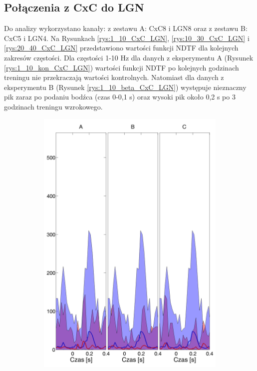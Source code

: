 \documentclass{pracamgr}
\begin{document}
	\subsection{Połączenia z CxC do LGN}
	Do analizy wykorzystano kanały: z zestawu A: CxC8 i LGN8 oraz z zestawu B: CxC5 i LGN4.
	Na Rysunkach \ref{rys:1_10_CxC_LGN}, \ref{rys:10_30_CxC_LGN} i \ref{rys:20_40_CxC_LGN} przedstawiono wartości funkcji NDTF dla kolejnych zakresów częstości. Dla częstości 1-10 Hz dla danych z eksperymentu A (Rysunek \ref{rys:1_10_kon_CxC_LGN}) wartości funkcji NDTF po kolejnych godzinach treningu nie przekraczają wartości kontrolnych. Natomiast dla danych z eksperymentu B (Rysunek \ref{rys:1_10_beta_CxC_LGN}) występuje  nieznaczny pik zaraz po podaniu bodźca (czas 0-0,1 s) oraz wysoki pik około 0,2 s po 3 godzinach treningu wzrokowego. 
		\begin{figure}[h]
		\begin{subfigure}{.5\textwidth}
			\centering
			\includegraphics[width=1.\linewidth]{kontrola15_1-10_z_CxC8_do_LGN82.png}

\end{subfigure}
\end{figure}
\end{document}

